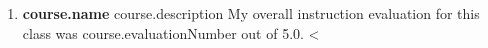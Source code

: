 \begin {enumerate}
<%
\item \textbf{{course.name}} {{course.description}} My overall instruction evaluation 
for this class was {{course.evaluationNumber}} out of 5.0.
<%
\end {enumerate}